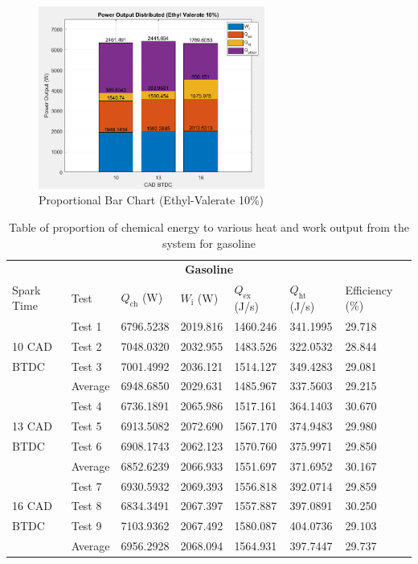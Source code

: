 \documentclass[11pt]{article}
\begin{document}
\begin{figure}[H]
	\centering
    \includegraphics[height = 6cm]{./img/diagram22.png}
    \caption{Proportional Bar Chart (Ethyl-Valerate 10\%)}
    \label{q4-f7}
\end{figure}
\begin{table}[H]
	\begin{center}
	\begin{tabular}{@{}l l l l l l l@{}}
		\toprule
		\multicolumn{7}{c}{\textbf{Gasoline}}\\
		Spark Time & Test & $Q_\textrm{ch}$ (W) & $W_\textrm{i}$ (W) & $Q_\textrm{ex}$ (J/s) & $Q_\textrm{ht}$ (J/s) & Efficiency (\%)\\
		\midrule
				& Test 1  & 6796.5238 & 2019.816 & 1460.246 & 341.1995 & 29.718\\
		10 CAD	& Test 2  & 7048.0320 & 2032.955 & 1483.526 & 322.0532 & 28.844\\
		BTDC	& Test 3  & 7001.4992 & 2036.121 & 1514.127 & 349.4283 & 29.081\\
				& Average & 6948.6850 & 2029.631 & 1485.967 & 337.5603 & 29.215\\
				& Test 4  & 6736.1891 & 2065.986 & 1517.161 & 364.1403 & 30.670\\
		13 CAD	& Test 5  & 6913.5082 & 2072.690 & 1567.170 & 374.9483 & 29.980\\
		BTDC	& Test 6  & 6908.1743 & 2062.123 & 1570.760 & 375.9971 & 29.850\\
				& Average & 6852.6239 & 2066.933 & 1551.697 & 371.6952 & 30.167\\	
				& Test 7  & 6930.5932 & 2069.393 & 1556.818 & 392.0714 & 29.859\\
		16 CAD	& Test 8  & 6834.3491 & 2067.397 & 1557.887 & 397.0891 & 30.250\\
		BTDC	& Test 9  & 7103.9362 & 2067.492 & 1580.087 & 404.0736 & 29.103\\
				& Average & 6956.2928 & 2068.094 & 1564.931 & 397.7447 & 29.737\\		
		\bottomrule
	\end{tabular}
	\caption{Table of proportion of chemical energy to various heat and work output from the system for gasoline}
	\label{q4-t1}
	\end{center}
\end{table}
\end{document}
